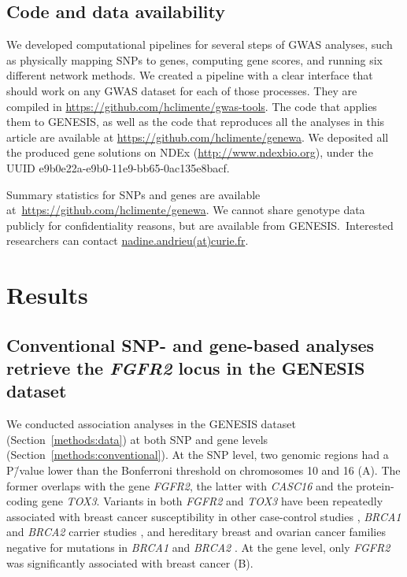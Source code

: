 \documentclass[10pt,letterpaper]{article}
\begin{document}
\subsection{Code and data availability}
\label{methods:code}

We developed computational pipelines for several steps of GWAS analyses, such as physically mapping SNPs to genes, computing gene scores, and running six different network methods. We created a pipeline with a clear interface that should work on any GWAS dataset for each of those processes. They are compiled in \url{https://github.com/hclimente/gwas-tools}. The code that applies them to GENESIS, as well as the code that reproduces all the analyses in this article are available at \url{https://github.com/hclimente/genewa}. We deposited all the produced gene solutions on NDEx (\url{http://www.ndexbio.org}), under the UUID e9b0e22a-e9b0-11e9-bb65-0ac135e8bacf.

Summary statistics for SNPs and genes are available at \url{https://github.com/hclimente/genewa}. We cannot share genotype data publicly for confidentiality reasons, but are available from GENESIS. Interested researchers can contact \href{mailto:nadine.andrieu@curie.fr}{nadine.andrieu(at)curie.fr}.

\section{Results}

\subsection{Conventional SNP- and gene-based analyses retrieve the \emph{FGFR2} locus in the GENESIS dataset}
\label{results:conventional}

We conducted association analyses in the GENESIS dataset (Section~\ref{methods:data}) at both SNP and gene levels (Section~\ref{methods:conventional}). At the SNP level, two genomic regions had a P\=/value lower than the Bonferroni threshold on chromosomes 10 and 16 (A). The former overlaps with the gene \emph{FGFR2}, the latter with \emph{CASC16} and the protein-coding gene \emph{TOX3}. Variants in both \emph{FGFR2} and \emph{TOX3} have been repeatedly associated with breast cancer susceptibility in other case-control studies \cite{Michailidou2017}, \emph{BRCA1} and \emph{BRCA2} carrier studies \cite{Mulligan2011}, and hereditary breast and ovarian cancer families negative for mutations in \emph{BRCA1} and \emph{BRCA2} \cite{rinella_genetic_2013}. At the gene level, only \emph{FGFR2} was significantly associated with breast cancer (B).
\end{document}
